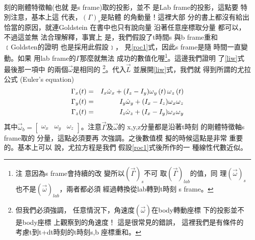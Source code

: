 \documentclass[12pt,twoside]{article}
\begin{document}
刻的剛體特徵軸(也就%
是s frame)取的投影，並不%
是Lab frame的投影，這點要%
特別注意，基本上這%
代表，$\left( \Gamma \right) _{s}$是貼體%
的角動量！這裡大部%
分的書上都沒有給出%
恰當的原因，就連Goldstein%
在書中也只有說向量%
沿著任意座標取分量%
都可以，不過這並無%
法合理解釋，事實上%
是，我們假設了t時間s%
與b frame重和﹝Goldsten的證明%
也是採用此假設﹞，%
見\ref{roc1}式，因此s frame是隨%
時間一直變動。如果%
用lab frame的$\Gamma $那麼就無法%
成功的數值化喔\footnote{注%
意因為s frame會持續的改%
變所以$\left( \vec{\Gamma}\right) _{s}$不可%
取$\left( \vec{\Gamma}\right) _{lab}$的值，同%
理$\left( \vec{\omega}\right) _{s}$也不是$\left( 
\vec{\omega}\right) _{lab}$，兩者都必須%
經過轉換從lab轉到t時刻%
s frame。}。這邊我們證明%
了\ref{liw}式最後那一項中%
的兩個$\vec{\omega}$是相同的%
\footnote{但我們必須強調，%
任意情況下，角速度$%
\left( \vec{\omega}\right) $在body轉動座標%
下的投影並不是body座標%
上觀察到的角速度！%
這是很常見的錯誤，%
這裡我們是有條件的%
考慮t到t+dt時刻的t時刻s,b%
座標重和。}。代入$\vec{L}$%
並展開\ref{liw}式，我們就%
得到所謂的尤拉公式%
(Euler's equation)%
\begin{eqnarray}
\Gamma _{x}(t) &=&I_{x}\dot{\omega}_{x}+(I_{z}-I_{y})\omega _{y}\left(
t\right) \omega _{z}\left( t\right)  \notag \\
\Gamma _{y}(t) &=&I_{y}\dot{\omega}_{y}+(I_{x}-I_{z})\omega _{x}\omega _{z}
\label{eulereqbody} \\
\Gamma _{z}(t) &=&I_{z}\dot{\omega}_{z}+(I_{x}-I_{y})\omega _{x}\omega _{y} 
\notag
\end{eqnarray}%
其中$\vec{\omega}_{b}=\left[ 
\begin{array}{ccc}
\omega _{x} & \omega _{y} & \omega _{z}%
\end{array}%
\right] $。注意$\vec{\Gamma}$及$\vec{\omega}$的%
x,y,z分量都是沿著t時刻%
的剛體特徵軸s frame取的%
分量，這點必須要再%
次強調。之後數值模%
擬的時候這點是非常%
重要的。基本上可以%
說，尤拉方程是我們%
假設\ref{roc1}式後所作的一%
種線性代數近似。
\end{document}
